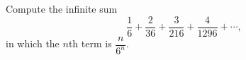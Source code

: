 Compute the infinite sum
\[\dfrac{1}{6}+\dfrac{2}{36}+\dfrac{3}{216}+\dfrac{4}{1296}+\cdots,\]
in which the $n$th term is $\dfrac{n}{6^n}$.
